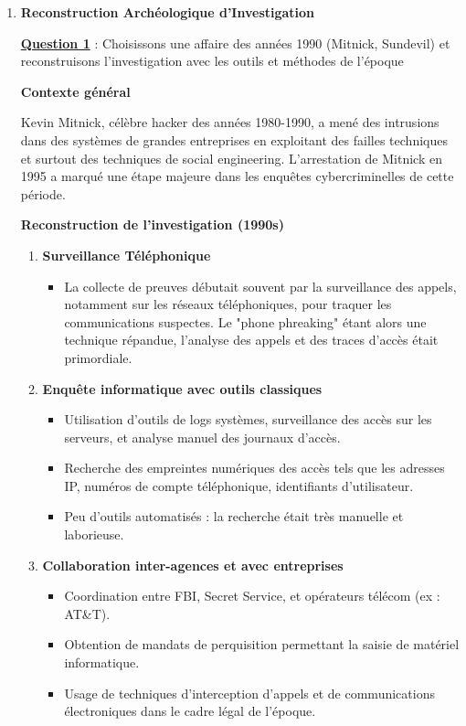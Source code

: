 \documentclass[12pt, a4paper]{article}
\newcommand{\question}[1]{\textbf{\underline{Question #1}}}
\begin{document}
	\begin{enumerate}[label=\textbf{\arabic*.}, start=6]
		\item \textbf{Reconstruction Archéologique d'Investigation}
		
		\question{1} : Choisissons une affaire des années 1990 (Mitnick, Sundevil) et reconstruisons l'investigation avec les outils et méthodes de l'époque
		
		\textbf{Contexte général}
		
		Kevin Mitnick, célèbre hacker des années 1980-1990, a mené des intrusions dans des systèmes de grandes entreprises en exploitant des failles techniques et surtout des techniques de social engineering. L'arrestation de Mitnick en 1995 a marqué une étape majeure dans les enquêtes cybercriminelles de cette période.
		
		\textbf{Reconstruction de l'investigation (1990s)}
		
		\begin{enumerate}
			\item \textbf{Surveillance Téléphonique}
			\begin{itemize}
				\item La collecte de preuves débutait souvent par la surveillance des appels, notamment sur les réseaux téléphoniques, pour traquer les communications suspectes. Le "phone phreaking" étant alors une technique répandue, l'analyse des appels et des traces d'accès était primordiale.
			\end{itemize}
			
			\item \textbf{Enquête informatique avec outils classiques}
			\begin{itemize}
				\item Utilisation d'outils de logs systèmes, surveillance des accès sur les serveurs, et analyse manuel des journaux d'accès.
				\item Recherche des empreintes numériques des accès tels que les adresses IP, numéros de compte téléphonique, identifiants d'utilisateur.
				\item Peu d'outils automatisés : la recherche était très manuelle et laborieuse.
			\end{itemize}
			
			\item \textbf{Collaboration inter-agences et avec entreprises}
			\begin{itemize}
				\item Coordination entre FBI, Secret Service, et opérateurs télécom (ex : AT\&T).
				\item Obtention de mandats de perquisition permettant la saisie de matériel informatique.
				\item Usage de techniques d'interception d'appels et de communications électroniques dans le cadre légal de l'époque.
			\end{itemize}
			

\end{enumerate}
\end{enumerate}
\end{document}

